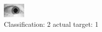 \begin{figure}[h!]
\begin{center}
\includegraphics[width=0.60\columnwidth]{figures/ID1507_class_2_target_1.png}
\end{center}
\caption{ Classification: 2 actual target: 1}
\label{fig:ID1507_class_2_target_1}
\end{figure}
